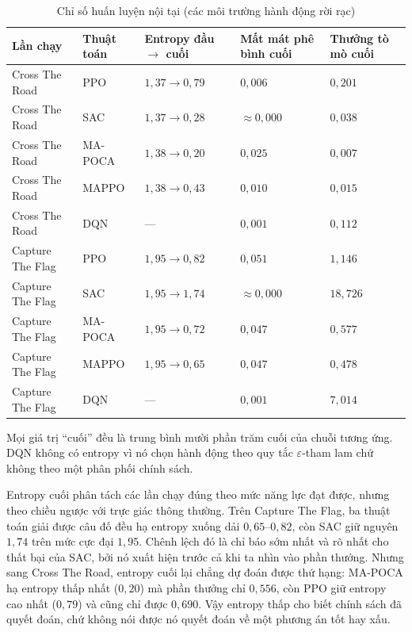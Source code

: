 \begin{table}[H]
\centering
\caption{Chỉ số huấn luyện nội tại (các môi trường hành động rời rạc)}
\label{tab:diagnostics}
\renewcommand{\arraystretch}{1.35}
\tablefont
\setlength{\tabcolsep}{4pt}
\begin{tabular}{|p{3.1cm}|>{\centering\arraybackslash}p{2.1cm}
                |>{\centering\arraybackslash}p{2.6cm}
                |>{\centering\arraybackslash}p{2.6cm}
                |>{\centering\arraybackslash}p{2.6cm}|}
\hline
\textbf{Lần chạy} & \textbf{Thuật toán} & \textbf{Entropy đầu $\to$ cuối} & \textbf{Mất mát phê bình cuối} & \textbf{Thưởng tò mò cuối} \\
\hline
Cross The Road & PPO & $1{,}37 \to 0{,}79$ & $0{,}006$ & $0{,}201$ \\
\hline
Cross The Road & SAC & $1{,}37 \to 0{,}28$ & $\approx 0{,}000$ & $0{,}038$ \\
\hline
Cross The Road & MA-POCA & $1{,}38 \to 0{,}20$ & $0{,}025$ & $0{,}007$ \\
\hline
Cross The Road & MAPPO & $1{,}38 \to 0{,}43$ & $0{,}010$ & $0{,}015$ \\
\hline
Cross The Road & DQN & --- & $0{,}001$ & $0{,}112$ \\
\hline
Capture The Flag & PPO & $1{,}95 \to 0{,}82$ & $0{,}051$ & $1{,}146$ \\
\hline
Capture The Flag & SAC & $1{,}95 \to 1{,}74$ & $\approx 0{,}000$ & $18{,}726$ \\
\hline
Capture The Flag & MA-POCA & $1{,}95 \to 0{,}72$ & $0{,}047$ & $0{,}577$ \\
\hline
Capture The Flag & MAPPO & $1{,}95 \to 0{,}65$ & $0{,}047$ & $0{,}478$ \\
\hline
Capture The Flag & DQN & --- & $0{,}001$ & $7{,}014$ \\
\hline
\end{tabular}

\vspace{0.15cm}
{\footnotesize Mọi giá trị ``cuối'' đều là trung bình mười phần trăm cuối của chuỗi
tương ứng. DQN không có entropy vì nó chọn hành động theo quy tắc $\varepsilon$-tham lam
chứ không theo một phân phối chính sách.}
\end{table}

\indent Entropy cuối phân tách các lần chạy đúng theo mức năng lực đạt được, nhưng theo
chiều ngược với trực giác thông thường. Trên Capture The Flag, ba thuật toán giải được câu
đố đều hạ entropy xuống dải $0{,}65$--$0{,}82$, còn SAC giữ nguyên $1{,}74$ trên mức cực
đại $1{,}95$. Chênh lệch đó là chỉ báo sớm nhất và rõ nhất cho thất bại của SAC, bởi nó xuất
hiện trước cả khi ta nhìn vào phần thưởng. Nhưng sang Cross The Road, entropy cuối lại
chẳng dự đoán được thứ hạng: MA-POCA hạ entropy thấp nhất ($0{,}20$) mà phần thưởng chỉ
$0{,}556$, còn PPO giữ entropy cao nhất ($0{,}79$) và cũng chỉ được $0{,}690$. Vậy entropy
thấp cho biết chính sách đã quyết đoán, chứ không nói được nó quyết đoán về một phương án
tốt hay xấu.

